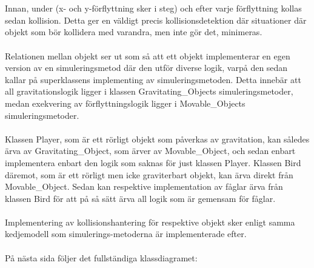 \documentclass{TDP003mall}
\begin{document}
\\\\
Innan, under (x- och y-förflyttning sker i steg) och efter varje förflyttning kollas sedan kollision. Detta ger en väldigt precis kollisionsdetektion där situationer där objekt som bör kollidera med varandra, men inte gör det, minimeras.
\\\\
Relationen mellan objekt ser ut som så att ett objekt implementerar en egen version av en simuleringsmetod där den utför diverse logik, varpå den sedan kallar på superklassens implementing av simuleringsmetoden. Detta innebär att all gravitationslogik ligger i klassen Gravitating\_Objects simuleringsmetoder, medan exekvering av förflyttningslogik ligger i Movable\_Objects simuleringsmetoder.
\\\\
Klassen Player, som är ett rörligt objekt som påverkas av gravitation, kan således ärva av Gravitating\_Object, som ärver av Movable\_Object, och sedan enbart implementera enbart den logik som saknas för just klassen Player. Klassen Bird däremot, som är ett rörligt men icke graviterbart objekt, kan ärva direkt från Movable\_Object. Sedan kan respektive implementation av fåglar ärva från klassen Bird för att på så sätt ärva all logik som är gemensam för fåglar.
\\\\
Implementering av kollisionshantering för respektive objekt sker enligt samma kedjemodell som simulerings-metoderna är implementerade efter.
\\\\
På nästa sida följer det fullständiga klassdiagramet:
\newpage
\end{document}
